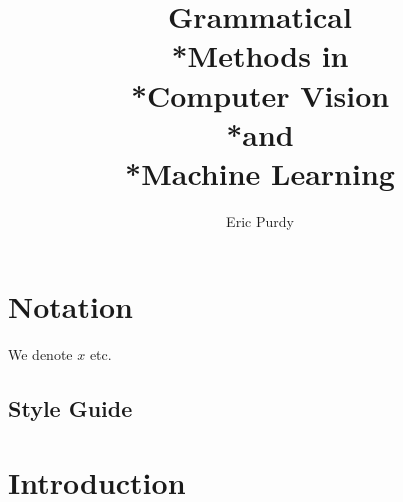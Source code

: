 \documentclass{book}
\title{ Grammatical\\*Methods in\\*Computer Vision\\*and\\*Machine Learning}
\author{Eric Purdy}
\newcommand{\openepigraph}[2]{%
  \begin{fullwidth}
  \sffamily\large
  \begin{doublespace}
  \noindent\allcaps{#1}\\%
  \noindent\allcaps{#2}%
  \end{doublespace}
  \end{fullwidth}
}
\begin{document}
\frontmatter





\maketitle

\setcounter{tocdepth}{2}
\tableofcontents

\listoffigures

\listoftables


\chapter{Notation}
  \label{chap-notation}

  We denote $x$ etc.

  \section{Style Guide}
  

\cleardoublepage
\mainmatter

\chapter{Introduction}
  \label{chap-intro}
  
\end{document}
